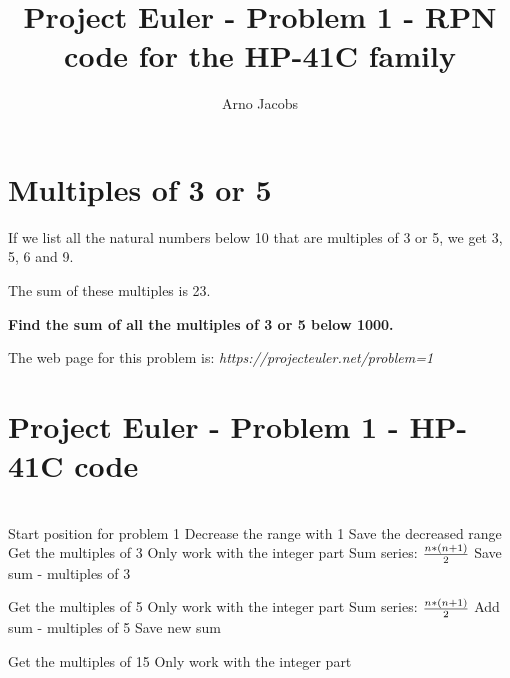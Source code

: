 \documentclass[a4paper, landscape]{article}
\author{Arno Jacobs}
\title{Project Euler - Problem 1 - RPN code for the HP-41C family}
\begin{document}
\maketitle

\rm
\section{Multiples of 3 or 5}

\bigskip
\noindent
If we list all the natural numbers below 10 that are multiples of 3 or 5, we get 3, 5, 6 and 9. 

\noindent
The sum of these multiples is 23.


\bigskip
\noindent
\textbf{Find the sum of all the multiples of 3 or 5 below 1000.}


\bigskip
\bigskip
\noindent
The web page for this problem is: 
\textit{https://projecteuler.net/problem=1}


\clearpage
\section{Project Euler - Problem 1 - HP-41C code}

\tStarttabular
{}
\\
		{Start position for problem 1}  
         {Decrease the range with 1}
\tOPminusfo			{}
        {Save the decreased range}
         {Get the multiples of 3}
\tOPdividefo 		{}
     {Only work with the integer part}
\tENTERfo			{}
\tENTERfo			{}
         {Sum series: $n*(n+1) \over 2$}
\tOPplusfo			{}
\tOPmultiplyfo		{}
       {}
\tOPmultiplyfo		{}
        {Save sum - multiples of 3}

\tNewPage

 		{}
			{Get the multiples of 5}
\tOPdividefo 		{}
     {Only work with the integer part}
\tENTERfo			{}
\tENTERfo			{}
         {Sum series: $n*(n+1) \over 2$}
\tOPplusfo			{}
\tOPmultiplyfo		{}
       {}
\tOPmultiplyfo		{}
 		{Add sum - multiples of 5}
\tOPplusfo			{}
        {Save new sum}

 		{}
		{Get the multiples of 15}
\tOPdividefo 		{}
     {Only work with the integer part}
		{}
\tENTERfo			{}
\tENTERfo			{}
\end{document}

